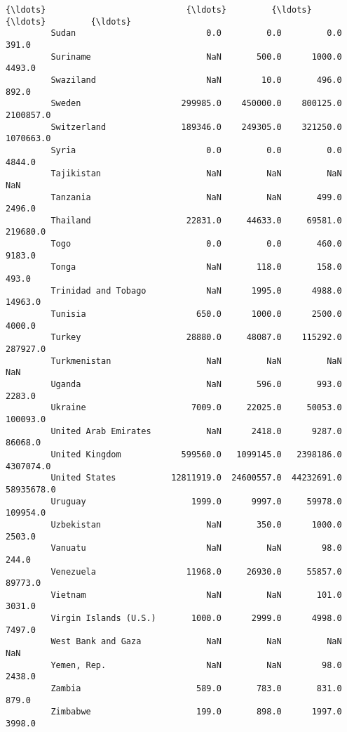 \documentclass[11pt]{article}
\begin{document}
\begin{Verbatim}[commandchars=\\\{\}]
         {\ldots}                            {\ldots}         {\ldots}         {\ldots}         {\ldots}   
         Sudan                          0.0         0.0         0.0       391.0   
         Suriname                       NaN       500.0      1000.0      4493.0   
         Swaziland                      NaN        10.0       496.0       892.0   
         Sweden                    299985.0    450000.0    800125.0   2100857.0   
         Switzerland               189346.0    249305.0    321250.0   1070663.0   
         Syria                          0.0         0.0         0.0      4844.0   
         Tajikistan                     NaN         NaN         NaN         NaN   
         Tanzania                       NaN         NaN       499.0      2496.0   
         Thailand                   22831.0     44633.0     69581.0    219680.0   
         Togo                           0.0         0.0       460.0      9183.0   
         Tonga                          NaN       118.0       158.0       493.0   
         Trinidad and Tobago            NaN      1995.0      4988.0     14963.0   
         Tunisia                      650.0      1000.0      2500.0      4000.0   
         Turkey                     28880.0     48087.0    115292.0    287927.0   
         Turkmenistan                   NaN         NaN         NaN         NaN   
         Uganda                         NaN       596.0       993.0      2283.0   
         Ukraine                     7009.0     22025.0     50053.0    100093.0   
         United Arab Emirates           NaN      2418.0      9287.0     86068.0   
         United Kingdom            599560.0   1099145.0   2398186.0   4307074.0   
         United States           12811919.0  24600557.0  44232691.0  58935678.0   
         Uruguay                     1999.0      9997.0     59978.0    109954.0   
         Uzbekistan                     NaN       350.0      1000.0      2503.0   
         Vanuatu                        NaN         NaN        98.0       244.0   
         Venezuela                  11968.0     26930.0     55857.0     89773.0   
         Vietnam                        NaN         NaN       101.0      3031.0   
         Virgin Islands (U.S.)       1000.0      2999.0      4998.0      7497.0   
         West Bank and Gaza             NaN         NaN         NaN         NaN   
         Yemen, Rep.                    NaN         NaN        98.0      2438.0   
         Zambia                       589.0       783.0       831.0       879.0   
         Zimbabwe                     199.0       898.0      1997.0      3998.0   
         

\end{Verbatim}
\end{document}
